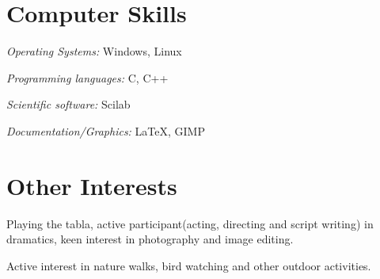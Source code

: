 \documentclass{res}
\begin{document}
\begin{resume}
\section{Computer Skills}
\vspace{0.1in}
{\textit {Operating Systems:}} Windows, Linux

{\textit {Programming languages:}} C, C++

{\textit {Scientific software:}} Scilab

{\textit {Documentation/Graphics:}} \LaTeX, GIMP
\section{Other Interests}
\vspace{0.1in}
Playing the tabla, active participant(acting, directing and script writing) in dramatics, keen interest in photography and image editing. 

Active interest in nature walks, bird watching and other outdoor activities.
 \end{resume}
\end{document}
